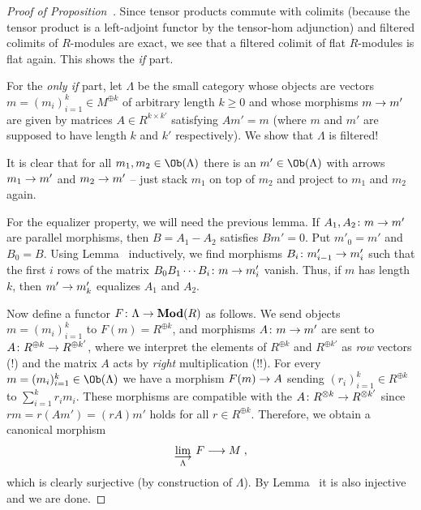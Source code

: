 \documentclass[a4paper,parskip=half,numbers=enddot, DIV=12]{scrreprt}
\renewcommand{\geq}{\geqslant}
\begin{document}
\begin{proof}[Proof of Proposition~]
	Since tensor products commute with colimits (because the tensor product is a left-adjoint functor by the tensor-hom adjunction) and filtered colimits of $R$-modules are exact, we see that a filtered colimit of flat $R$-modules is flat again. This shows the \emph{if} part.
	
	For the \emph{only if} part, let $\Lambda$ be the small category whose objects are vectors $m=(m_i)_{i=1}^k\in M^{\oplus k}$ of arbitrary length $k\geq 0$ and whose morphisms $m\morphism m'$ are given by matrices $A\in R^{k\times k'}$ satisfying $Am'=m$ (where $m$ and $m'$ are supposed to have length $k$ and $k'$ respectively). We show that $\Lambda$ is filtered!
	
	It is clear that for all $m_1,m_2\in\Ob(\Lambda)$ there is an $m'\in\Ob(\Lambda)$ with arrows $m_1\morphism m'$ and $m_2\morphism m'$ -- just stack $m_1$ on top of $m_2$ and project to $m_1$ and $m_2$ again.
	
	For the equalizer property, we will need the previous lemma. If $A_1,A_2\colon m\morphism m'$ are parallel morphisms, then $B=A_1-A_2$ satisfies $Bm'=0$. Put $m'_0=m'$ and $B_0=B$. Using Lemma~ inductively, we find morphisms $B_i\colon m_{i-1}'\morphism m_i'$ such that the first $i$ rows of the matrix $B_0B_1\cdots B_i\colon m\morphism m'_i$ vanish. Thus, if $m$ has length $k$, then $m'\morphism m'_k$ equalizes $A_1$ and $A_2$.
	
	Now define a functor $F\colon \Lambda\morphism\cat{Mod}(R)$ as follows. We send objects $m=(m_i)_{i=1}^k$ to $F(m)=R^{\oplus k}$, and morphisms $A\colon m\morphism m'$ are sent to $A\colon R^{\oplus k}\morphism R^{\oplus k'}$, where we interpret the elements of $R^{\oplus k}$ and $R^{\oplus k'}$ as \emph{row} vectors (!) and the matrix $A$ acts by \emph{right} multiplication (!!). For every $m=(m_i)_{i=1}^k\in\Ob(\Lambda)$ we have a morphism $F(m)\morphism A$ sending $(r_i)_{i=1}^k\in R^{\oplus k}$ to $\sum_{i=1}^kr_im_i$. These morphisms are compatible with the $A\colon R^{\otimes k}\morphism R^{\otimes k'}$ since $rm=r(Am')=(rA)m'$ holds for all $r\in R^{\oplus k}$. Therefore, we obtain a canonical morphism
	\begin{align*}
		\colimit[\Lambda]F\morphism M\;,
	\end{align*}
	which is clearly surjective (by construction of $\Lambda$). By Lemma~ it is also injective and we are done.
\end{proof}
\end{document}
